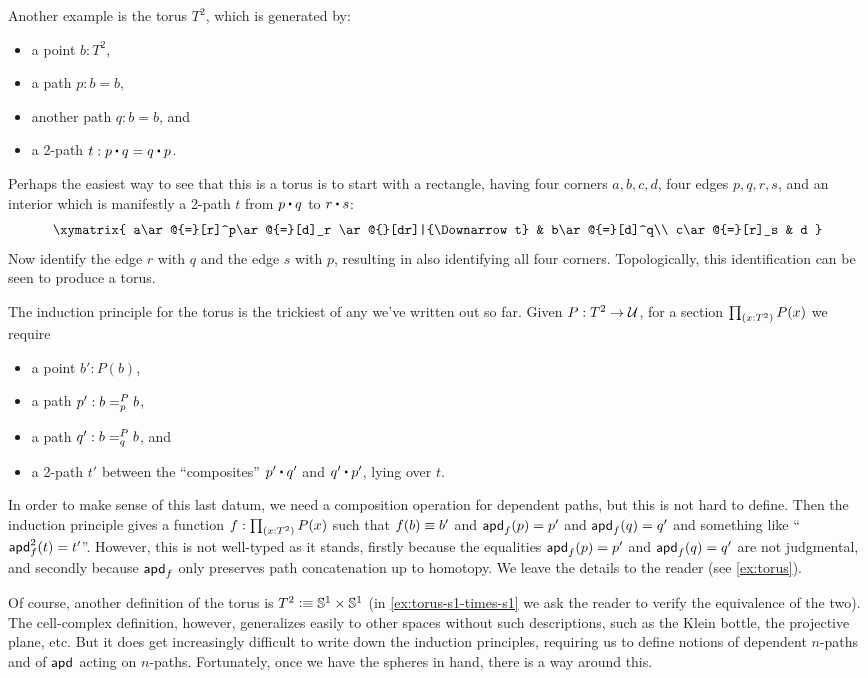 %
Another example is the torus $T^2$, which is generated by:
\begin{itemize}
\item a point $b:T^2$,
\item a path $p:b=b$,
\item another path $q:b=b$, and
\item a 2-path $t: p\ct q = q \ct p$.
\end{itemize}
Perhaps the easiest way to see that this is a torus is to start with a rectangle, having four corners $a,b,c,d$, four edges $p,q,r,s$, and an interior which is manifestly a 2-path $t$ from $p\ct q$ to $r\ct s$:
\begin{equation*}
  \xymatrix{
      a\ar@{=}[r]^p\ar@{=}[d]_r \ar@{}[dr]|{\Downarrow t} &
      b\ar@{=}[d]^q\\
      c\ar@{=}[r]_s &
      d
      }
\end{equation*}
Now identify the edge $r$ with $q$ and the edge $s$ with $p$, resulting in also identifying all four corners.
Topologically, this identification can be seen to produce a torus.

%
%
The induction principle for the torus is the trickiest of any we've written out so far.
Given $P:T^2\to\type$, for a section $\prd{x:T^2} P(x)$ we require
\begin{itemize}
\item a point $b':P(b)$,
\item a path $p' : \dpath P p b b$,
\item a path $q' : \dpath P q b b$, and
\item a 2-path $t'$ between the ``composites'' $p'\ct q'$ and $q'\ct p'$, lying over $t$.
\end{itemize}
In order to make sense of this last datum, we need a composition operation for dependent paths, but this is not hard to define.
Then the induction principle gives a function $f:\prd{x:T^2} P(x)$ such that $f(b)\jdeq b'$ and $\apd f {p} = p'$ and $\apd f {q} = q'$ and something like ``$\apdtwo f t = t'$''.
However, this is not well-typed as it stands, firstly because the equalities $\apd f {p} = p'$ and $\apd f {q} = q'$ are not judgmental, and secondly because $\apdfunc f$ only preserves path concatenation up to homotopy.
We leave the details to the reader (see \autoref{ex:torus}).

Of course, another definition of the torus is $T^2 \defeq \Sn^1 \times \Sn^1$ (in \autoref{ex:torus-s1-times-s1} we ask the reader to verify the equivalence of the two).
%
%
The cell-complex definition, however, generalizes easily to other spaces without such descriptions, such as the Klein bottle, the projective plane, etc.
But it does get increasingly difficult to write down the induction principles, requiring us to define notions of dependent $n$-paths and of $\apdfunc{}$ acting on $n$-paths.
Fortunately, once we have the spheres in hand, there is a way around this.

